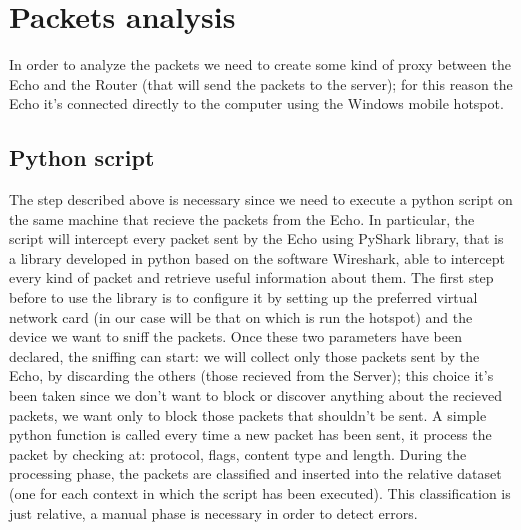 \documentclass[sigconf]{acmart}
\begin{document}
    \section{Packets analysis}
    In order to analyze the packets we need to create some kind of proxy between the Echo and the Router (that will send the packets to the server); for this reason the Echo it's connected directly to the computer using the Windows mobile hotspot.

    \subsection{Python script}
    The step described above is necessary since we need to execute a python script on the same machine that recieve the packets from the Echo. In particular, the script will intercept every packet sent by the Echo using PyShark library, that is a library developed in python based on the software Wireshark, able to intercept every kind of packet and retrieve useful information about them. The first step before to use the library is to configure it by setting up the preferred virtual network card (in our case will be that on which is run the hotspot) and the device we want to sniff the packets. Once these two parameters have been declared, the sniffing can start: we will collect only those packets sent by the Echo, by discarding the others (those recieved from the Server); this choice it's been taken since we don't want to block or discover anything about the recieved packets, we want only to block those packets that shouldn't be sent. A simple python function is called every time a new packet has been sent, it process the packet by checking at: protocol, flags, content type and length. During the processing phase, the packets are classified and inserted into the relative dataset (one for each context in which the script has been executed). This classification is just relative, a manual phase is necessary in order to detect errors.
\end{document}
